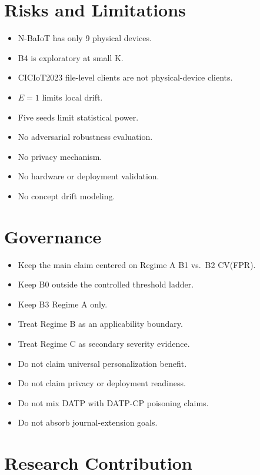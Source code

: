 \begin{minipage}[t]{0.48\linewidth}
\section{Risks and Limitations}
\begin{itemize}
  \item N-BaIoT has only 9 physical devices.
  \item B4 is exploratory at small K.
  \item CICIoT2023 file-level clients are not physical-device clients.
  \item $E=1$ limits local drift.
  \item Five seeds limit statistical power.
  \item No adversarial robustness evaluation.
  \item No privacy mechanism.
  \item No hardware or deployment validation.
  \item No concept drift modeling.
\end{itemize}
\end{minipage}%
\hfill
\begin{minipage}[t]{0.48\linewidth}
\section{Governance}
\begin{itemize}
  \item Keep the main claim centered on Regime A B1 vs.\ B2 CV(FPR).
  \item Keep B0 outside the controlled threshold ladder.
  \item Keep B3 Regime A only.
  \item Treat Regime B as an applicability boundary.
  \item Treat Regime C as secondary severity evidence.
  \item Do not claim universal personalization benefit.
  \item Do not claim privacy or deployment readiness.
  \item Do not mix DATP with DATP-CP poisoning claims.
  \item Do not absorb journal-extension goals.
\end{itemize}
\end{minipage}

\vspace{0.6em}

\section{Research Contribution}

